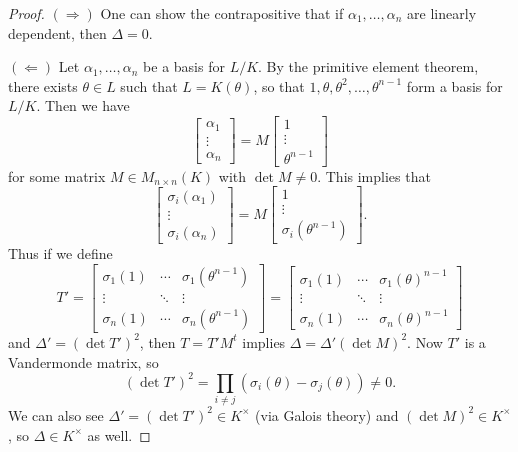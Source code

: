 \begin{proof}
  $(\Rightarrow)$ One can show the contrapositive
  that if $\alpha_1, \dots, \alpha_n$ are linearly
  dependent, then $\Delta = 0$.

  $(\Leftarrow)$ Let $\alpha_1, \dots, \alpha_n$
  be a basis for $L / K$.
  By the primitive element theorem, there exists
  $\theta \in L$ such that $L = K(\theta)$, so
  that $1, \theta, \theta^2, \dots, \theta^{n - 1}$
  form a basis for $L / K$. Then we have
  \[
    \begin{bmatrix}
      \alpha_1 \\ \vdots \\ \alpha_n
    \end{bmatrix}
    = M
    \begin{bmatrix}
      1 \\ \vdots \\ \theta^{n - 1}
    \end{bmatrix}
  \]
  for some matrix $M \in M_{n \times n}(K)$ with
  $\det M \ne 0$.
  This implies that
  \[
    \begin{bmatrix}
      \sigma_i(\alpha_1)  \\ \vdots \\ \sigma_i(\alpha_n)
    \end{bmatrix}
    = M
    \begin{bmatrix}
      1 \\ \vdots \\ \sigma_i(\theta^{n - 1})
    \end{bmatrix}.
  \]
  Thus if we define
  \[
    T' =
    \begin{bmatrix}
      \sigma_1(1) & \cdots & \sigma_1(\theta^{n - 1}) \\
      \vdots & \ddots & \vdots \\
      \sigma_n(1) & \cdots & \sigma_n(\theta^{n - 1})
    \end{bmatrix}
    =
    \begin{bmatrix}
      \sigma_1(1) & \cdots & \sigma_1(\theta)^{n - 1} \\
      \vdots & \ddots & \vdots \\
      \sigma_n(1) & \cdots & \sigma_n(\theta)^{n - 1}
    \end{bmatrix}
  \]
  and $\Delta' = (\det T')^2$, then
  $T = T' M^t$ implies $\Delta = \Delta' (\det M)^2$.
  Now $T'$ is a Vandermonde matrix, so
  \[
    (\det T')^2 = \prod_{i \ne j} (\sigma_i(\theta) - \sigma_j(\theta)) \ne 0.
  \]
  We can also see $\Delta' = (\det T')^2 \in K^\times$ (via Galois theory)
  and $(\det M)^2 \in K^\times$, so
  $\Delta \in K^\times$ as well.
\end{proof}

